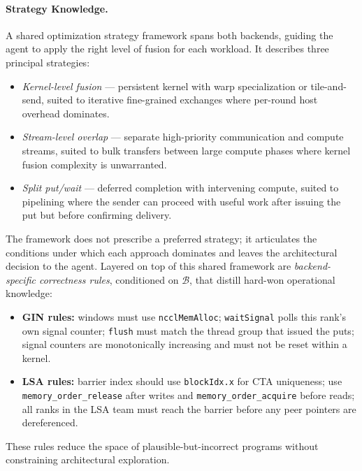 \paragraph{Strategy Knowledge.}
A shared optimization strategy framework spans both backends, guiding the agent to apply the right level of fusion for each workload. It describes three principal strategies:
\begin{itemize}[leftmargin=1.4em,itemsep=1pt,topsep=2pt]
\item \emph{Kernel-level fusion} --- persistent kernel with warp specialization or tile-and-send, suited to iterative fine-grained exchanges where per-round host overhead dominates.
\item \emph{Stream-level overlap} --- separate high-priority communication and compute streams, suited to bulk transfers between large compute phases where kernel fusion complexity is unwarranted.
\item \emph{Split put/wait} --- deferred completion with intervening compute, suited to pipelining where the sender can proceed with useful work after issuing the put but before confirming delivery.
\end{itemize}
The framework does not prescribe a preferred strategy; it articulates the conditions under which each approach dominates and leaves the architectural decision to the agent. Layered on top of this shared framework are \emph{backend-specific correctness rules}, conditioned on $\mathcal{B}$, that distill hard-won operational knowledge:
\begin{itemize}[leftmargin=1.4em,itemsep=1pt,topsep=2pt]
\item \textbf{GIN rules:} windows must use \texttt{ncclMemAlloc}; \texttt{waitSignal} polls this rank's own signal counter; \texttt{flush} must match the thread group that issued the puts; signal counters are monotonically increasing and must not be reset within a kernel.
\item \textbf{LSA rules:} barrier index should use \texttt{blockIdx.x} for CTA uniqueness; use \texttt{memory\_order\_release} after writes and \texttt{memory\_order\_acquire} before reads; all ranks in the LSA team must reach the barrier before any peer pointers are dereferenced.
\end{itemize}
These rules reduce the space of plausible-but-incorrect programs without constraining architectural exploration.

